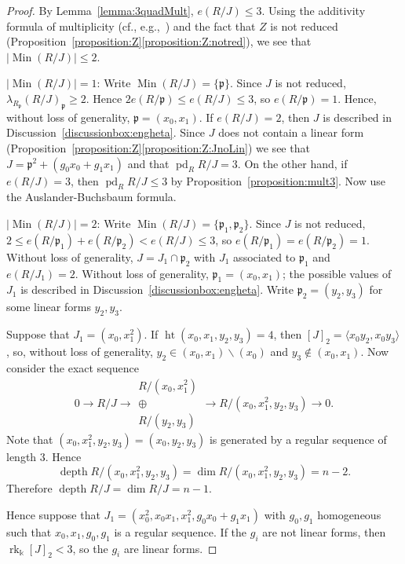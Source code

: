 \documentclass[11pt,a4paper]{amsart}
\theoremstyle{plain}
\theoremstyle{definition}
\newcommand{\frakp}{{\mathfrak p}}
\DeclareMathOperator{\rank}{rk}
\DeclareMathOperator{\projdim}{pd}
\DeclareMathOperator{\height}{ht}
\DeclareMathOperator{\Min}{Min}
\DeclareMathOperator{\depth}{depth}
\newcommand{\minus}{\ensuremath{\smallsetminus}}
\begin{document}
\begin{proof}
%
By Lemma~\ref{lemma:3quadMult}, $e(R/J ) \leq 3$.
Using the additivity formula of multiplicity
(cf., e.g.,~\cite[Exercise~12.11]{eiscommalg})
and the fact that $Z$ is not reduced
(Proposition~\ref{proposition:Z}\eqref{proposition:Z:notred}), we see that
$|\Min(R/J)| \leq 2$.

\underline{$|\Min(R/J)| = 1$}: 
Write $\Min(R/J) = \{\frakp\}$.
Since $J$ is not reduced, $\lambda_{R_\frakp}(R/J)_{\frakp} \geq 2$.
Hence $2 e(R/\frakp) \leq e(R/J) \leq 3$,
so $e(R/\frakp) = 1$.
Hence, without loss of generality, $\frakp = (x_0, x_1)$.
If $e(R/J) = 2$, then $J$ is described in 
Discussion~\ref{discussionbox:engheta}.
Since $J$ does not contain a linear form
(Proposition~\ref{proposition:Z}\eqref{proposition:Z:JnoLin})
we see that $J = \frakp^2 + (g_0x_0+g_1x_1)$ 
and that $\projdim_R R/J =3$.
On the other hand, if $e(R/J) = 3$, then 
$\projdim_R R/J \leq 3$ by Proposition~\ref{proposition:mult3}.
Now use the Auslander-Buchsbaum formula.

\underline{$|\Min(R/J)| = 2$}: 
Write $\Min(R/J) = \{\frakp_1, \frakp_2\}$.
Since $J$ is not reduced, $2 \leq e(R/\frakp_1) + e(R/\frakp_2 ) 
< e(R/J) \leq 3$,
so $e(R/\frakp_1) = e(R/\frakp_2 )  = 1$.
Without loss of generality, $J = J_1 \cap \frakp_2$ with 
$J_1$ associated to $\frakp_1$ and $e(R/J_1) = 2$. 
Without loss of generality, $\frakp_1 = (x_0, x_1)$; the possible values of
$J_1$ is described in Discussion~\ref{discussionbox:engheta}.
Write $\frakp_2 = (y_2, y_3)$ for some linear forms $y_2, y_3$.

Suppose that $J_1 = (x_0, x_1^2)$.
If $\height (x_0, x_1, y_2, y_3) = 4$, then $[J]_2 = \langle x_0y_2,
x_0y_3\rangle$, so, without loss of
generality, $y_2 \in (x_0, x_1) \minus (x_0)$ and $y_3 \not \in (x_0,
x_1)$.
Now consider the exact sequence
\[
0 \to R/J \to 
\begin{matrix}
R/(x_0, x_1^2) \\ \oplus \\ R/(y_2, y_3) 
\end{matrix}
\to R/(x_0, x_1^2, y_2, y_3) \to 0.
\]
Note that $(x_0, x_1^2, y_2, y_3)=(x_0, y_2, y_3)$ is generated by a
regular sequence of length $3$. Hence
\[
\depth R/(x_0, x_1^2, y_2, y_3)  = \dim R/(x_0, x_1^2, y_2, y_3)= n-2.
\]
Therefore $\depth R/J = \dim R/J = n-1$.

Hence suppose that $J_1 =  (x_0^2, x_0x_1, x_1^2, g_0x_0 + g_1x_1)$ with
$g_0, g_1$ homogeneous such that $x_0, x_1, g_0, g_1$ is a regular
sequence. If the $g_i$ are not linear forms, then 
$\rank_\Bbbk [J]_2<3$, so the $g_i$ are linear forms.


\end{proof}
\end{document}

